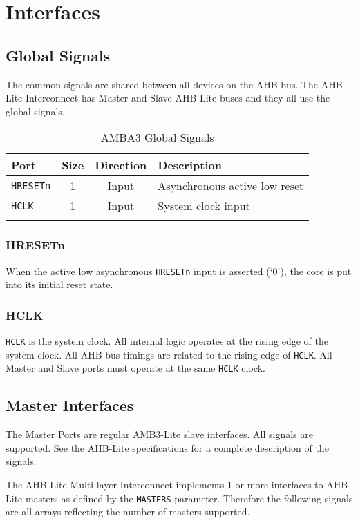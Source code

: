 \chapter{Interfaces}\label{interfaces}


\section{Global Signals}\label{global-signals}

The common signals are shared between all devices on the AHB bus. The
AHB-Lite Interconnect has Master and Slave AHB-Lite buses and they all
use the global signals.

\begin{longtable}[]{@{}lccl@{}}
\toprule
Port & Size & Direction & Description\tabularnewline
\midrule
\endhead
\texttt{HRESETn} & 1 & Input & Asynchronous active low reset\tabularnewline
\texttt{HCLK} & 1 & Input & System clock input\tabularnewline
\bottomrule
\caption{AMBA3 Global Signals}
\end{longtable}

\subsection{HRESETn}\label{hresetn}

When the active low asynchronous \texttt{HRESETn} input is asserted (`0'), the
core is put into its initial reset state.

\subsection{HCLK}\label{hclk}

\texttt{HCLK} is the system clock. All internal logic operates at the rising edge
of the system clock. All AHB bus timings are related to the rising edge
of \texttt{HCLK}. All Master and Slave ports must operate at the same \texttt{HCLK} clock.

\section{Master Interfaces}\label{master-interfaces}

The Master Ports are regular AMB3-Lite slave interfaces. All signals are
supported. See the AHB-Lite specifications for a complete description of
the signals.

The AHB-Lite Multi-layer Interconnect implements 1 or more interfaces to AHB-Lite masters
as defined by the \texttt{MASTERS} parameter. Therefore the following signals are all
arrays reflecting the number of masters supported.

